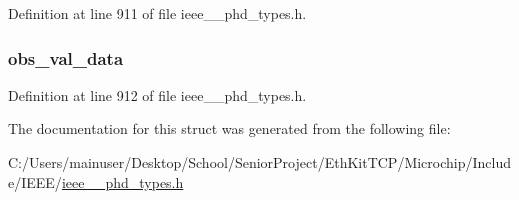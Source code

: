 Definition at line 911 of file ieee\+\_\+\_\+phd\+\_\+types.\+h.

\hypertarget{struct___observation_scan_fixed_accb40693f89811b00b0a93b4bce000d4}{}
\subsubsection[{obs\+\_\+val\+\_\+data}]{ obs\+\_\+val\+\_\+data}\label{struct___observation_scan_fixed_accb40693f89811b00b0a93b4bce000d4}


Definition at line 912 of file ieee\+\_\+\_\+phd\+\_\+types.\+h.



The documentation for this struct was generated from the following file\+:\begin{DoxyCompactItemize}
\item 
C\+:/\+Users/mainuser/\+Desktop/\+School/\+Senior\+Project/\+Eth\+Kit\+T\+C\+P/\+Microchip/\+Include/\+I\+E\+E\+E/\hyperlink{ieee__11073__phd__types_8h}{ieee\+\_\+\_\+phd\+\_\+types.\+h}\end{DoxyCompactItemize}

